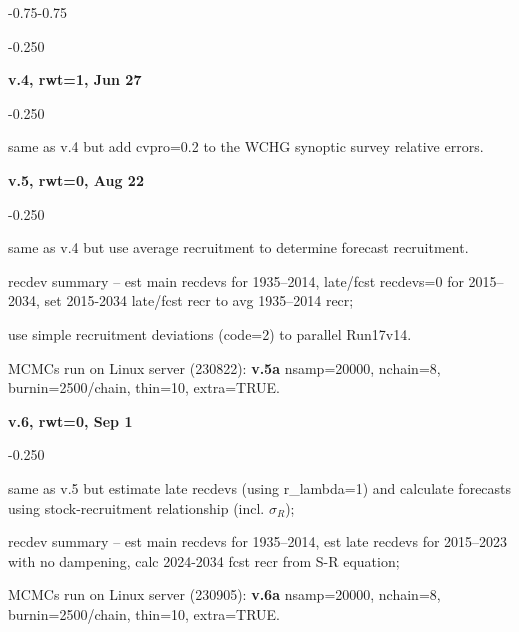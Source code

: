 \begin{itemize_csas}{-0.75}{-0.75}
\begin{itemize_csas}{-0.25}{0}
	\end{itemize_csas}
	\item \textbf{v.4, rwt=1, Jun 27}
	\begin{itemize_csas}{-0.25}{0}
		\item same as v.4 but add cvpro=0.2 to the WCHG synoptic survey relative errors.
	\end{itemize_csas}
	\item \textbf{v.5, rwt=0, Aug 22}
	\begin{itemize_csas}{-0.25}{0}
		\item same as v.4 but use average recruitment to determine forecast recruitment.
		\item recdev summary -- est main recdevs for 1935--2014, late/fcst recdevs=0 for 2015--2034, set 2015-2034 late/fcst recr to avg 1935--2014 recr;
		\item use simple recruitment deviations (code=2) to parallel Run17v14.
		\item MCMCs run on Linux server (230822): \textbf{v.5a} nsamp=20000, nchain=8, burnin=2500/chain, thin=10, extra=TRUE.
	\end{itemize_csas}
	\item \textbf{v.6, rwt=0, Sep 1}
	\begin{itemize_csas}{-0.25}{0}
		\item same as v.5 but estimate late recdevs (using r\_lambda=1) and calculate forecasts using stock-recruitment relationship (incl. $\sigma_R$);
		\item recdev summary -- est main recdevs for 1935--2014, est late recdevs for 2015--2023 with no dampening, calc 2024-2034 fcst recr from S-R equation;
		\item MCMCs run on Linux server (230905): \textbf{v.6a} nsamp=20000, nchain=8, burnin=2500/chain, thin=10, extra=TRUE.
	\end{itemize_csas}
\end{itemize_csas}

